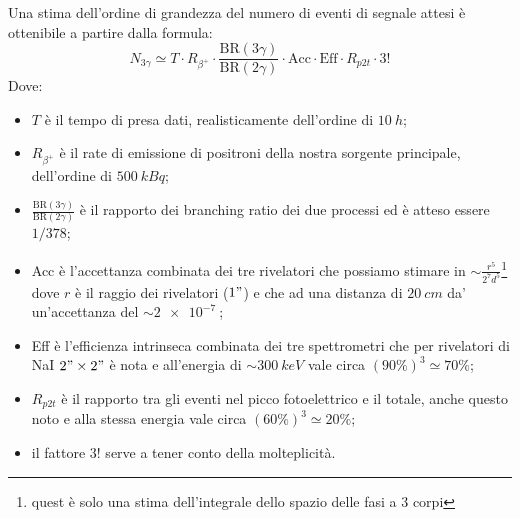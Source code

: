 Una stima dell'ordine di grandezza del numero di eventi di segnale attesi è ottenibile a partire dalla formula:
\begin{equation}
\label{eq:stima_3gamma}
N_{3\gamma} \simeq T \cdot R_{\beta^+} \cdot \frac{\text{BR}(3\gamma)}{\text{BR}(2\gamma)} \cdot \text{Acc} \cdot \text{Eff} \cdot R_{p2t} \cdot 3!
\end{equation}
Dove:
\begin{itemize}
	\item $T$ è il tempo di presa dati, realisticamente dell'ordine di $\SI{10}{h}$;
	\item $R_{\beta^+}$ è il rate di emissione di positroni della nostra sorgente principale, dell'ordine di $\SI{500}{kBq}$;
	\item $\frac{\text{BR}(3\gamma)}{\text{BR}(2\gamma)}$ è il rapporto dei branching ratio dei due processi ed è atteso essere $1/378$;
	\item Acc è l'accettanza combinata dei tre rivelatori che possiamo stimare in $\sim \frac{r^5}{2^7 d^5}$\footnote{quest è solo una stima dell'integrale dello spazio delle fasi a 3 corpi} dove $r$ è il raggio dei rivelatori ($1"$) e che ad una distanza di $\SI{20}{cm}$ da' un'accettanza del $\sim\SI{2e-7}{}$;
	\item Eff è l'efficienza intrinseca combinata dei tre spettrometri che per rivelatori di NaI $2"\times2"$ è nota \cite{knoll} e all'energia di $\sim \SI{300}{keV}$ vale circa $(90\%)^3 \simeq  70\%$;
	\item $R_{p2t}$ è il rapporto tra gli eventi nel picco fotoelettrico e il totale, anche questo noto \cite{knoll} e alla stessa energia vale circa $(60\%)^3 \simeq 20\%$;
	\item il fattore $3!$ serve a tener conto della molteplicità.
\end{itemize}
